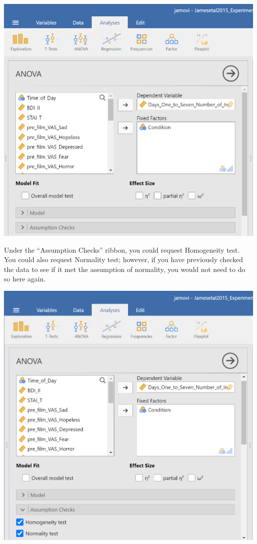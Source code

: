 \documentclass[
]{book}
\begin{document}
\includegraphics{img/ANOVACommandsWithVariablesSelected.png}

Under the ``Assumption Checks'' ribbon, you could request { Homogeneity test}. You could also request { Normality test}; however, if you have previously checked the data to see if it met the assumption of normality, you would not need to do so here again.

\includegraphics{img/ANOVACommandsWithAssumptionChecksAndVariance.png}
\end{document}
